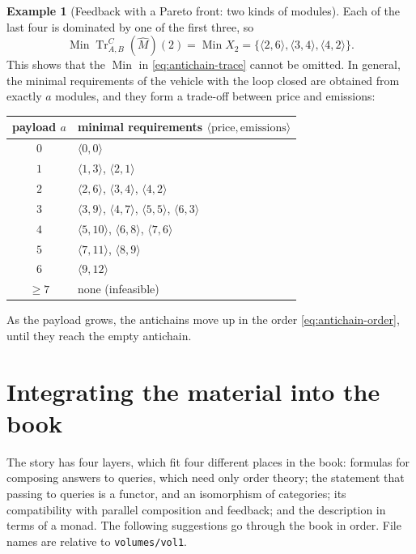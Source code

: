 \documentclass[11pt,a4paper]{article}
\theoremstyle{plain}
\theoremstyle{definition}
\newtheorem{example}[theorem]{Example}
\theoremstyle{remark}
\newcommand{\tup}[1]{\langle #1 \rangle}
\DeclareMathOperator{\Min}{Min}
\DeclareMathOperator{\Tr}{Tr}
\newcommand{\file}[1]{\nolinkurl{#1}}
\begin{document}
\begin{example}[Feedback with a Pareto front: two kinds of modules]
    Each of the last four is dominated by one of the first three, so
    \begin{equation*}
        \Min \Tr^{C}_{A,B}(\widehat{M})(2) = \Min X_2 = \{ \tup{2,6}, \tup{3,4}, \tup{4,2} \}.
    \end{equation*}
    This shows that the $\Min$ in \cref{eq:antichain-trace} cannot be omitted.
    In general, the minimal requirements of the vehicle with the loop closed are obtained from exactly $a$ modules, and they form a trade-off between price and emissions:
    \begin{center}
        \renewcommand{\arraystretch}{1.2}
        \begin{tabular}{cl}
            \toprule
            payload $a$ & minimal requirements $\tup{\text{price}, \text{emissions}}$ \\
            \midrule
            $0$ & $\tup{0,0}$ \\
            $1$ & $\tup{1,3}$, $\tup{2,1}$ \\
            $2$ & $\tup{2,6}$, $\tup{3,4}$, $\tup{4,2}$ \\
            $3$ & $\tup{3,9}$, $\tup{4,7}$, $\tup{5,5}$, $\tup{6,3}$ \\
            $4$ & $\tup{5,10}$, $\tup{6,8}$, $\tup{7,6}$ \\
            $5$ & $\tup{7,11}$, $\tup{8,9}$ \\
            $6$ & $\tup{9,12}$ \\
            $\geq 7$ & none (infeasible) \\
            \bottomrule
        \end{tabular}
    \end{center}
    As the payload grows, the antichains move up in the order \cref{eq:antichain-order}, until they reach the empty antichain.
\end{example}

\section{Integrating the material into the book}
\label{sec:integration}

The story has four layers, which fit four different places in the book: formulas for composing answers to queries, which need only order theory; the statement that passing to queries is a functor, and an isomorphism of categories; its compatibility with parallel composition and feedback; and the description in terms of a monad.
The following suggestions go through the book in order.
File names are relative to \file{volumes/vol1}.
\end{document}
